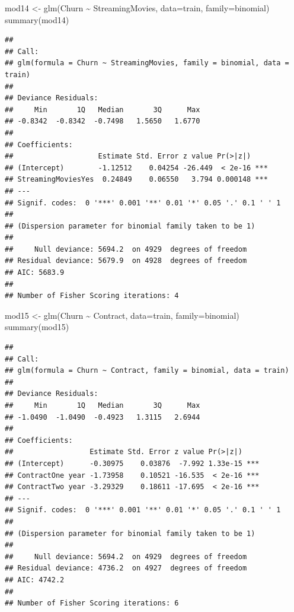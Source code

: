 \documentclass[
  twoside]{article}
\newenvironment{Shaded}{\begin{snugshade}}{\end{snugshade}}
\newcommand{\AttributeTok}[1]{\textcolor[rgb]{0.77,0.63,0.00}{#1}}
\newcommand{\FunctionTok}[1]{\textcolor[rgb]{0.00,0.00,0.00}{#1}}
\newcommand{\NormalTok}[1]{#1}
\newcommand{\OtherTok}[1]{\textcolor[rgb]{0.56,0.35,0.01}{#1}}
\newcommand{\SpecialCharTok}[1]{\textcolor[rgb]{0.00,0.00,0.00}{#1}}
\begin{document}
\begin{Shaded}
\begin{Highlighting}[]
\NormalTok{mod14 }\OtherTok{\textless{}{-}} \FunctionTok{glm}\NormalTok{(Churn }\SpecialCharTok{\textasciitilde{}}\NormalTok{ StreamingMovies, }\AttributeTok{data=}\NormalTok{train, }\AttributeTok{family=}\NormalTok{binomial)}
\FunctionTok{summary}\NormalTok{(mod14)}
\end{Highlighting}
\end{Shaded}

\begin{verbatim}
## 
## Call:
## glm(formula = Churn ~ StreamingMovies, family = binomial, data = train)
## 
## Deviance Residuals: 
##     Min       1Q   Median       3Q      Max  
## -0.8342  -0.8342  -0.7498   1.5650   1.6770  
## 
## Coefficients:
##                    Estimate Std. Error z value Pr(>|z|)    
## (Intercept)        -1.12512    0.04254 -26.449  < 2e-16 ***
## StreamingMoviesYes  0.24849    0.06550   3.794 0.000148 ***
## ---
## Signif. codes:  0 '***' 0.001 '**' 0.01 '*' 0.05 '.' 0.1 ' ' 1
## 
## (Dispersion parameter for binomial family taken to be 1)
## 
##     Null deviance: 5694.2  on 4929  degrees of freedom
## Residual deviance: 5679.9  on 4928  degrees of freedom
## AIC: 5683.9
## 
## Number of Fisher Scoring iterations: 4
\end{verbatim}

\begin{Shaded}
\begin{Highlighting}[]
\NormalTok{mod15 }\OtherTok{\textless{}{-}} \FunctionTok{glm}\NormalTok{(Churn }\SpecialCharTok{\textasciitilde{}}\NormalTok{ Contract, }\AttributeTok{data=}\NormalTok{train, }\AttributeTok{family=}\NormalTok{binomial)}
\FunctionTok{summary}\NormalTok{(mod15)}
\end{Highlighting}
\end{Shaded}

\begin{verbatim}
## 
## Call:
## glm(formula = Churn ~ Contract, family = binomial, data = train)
## 
## Deviance Residuals: 
##     Min       1Q   Median       3Q      Max  
## -1.0490  -1.0490  -0.4923   1.3115   2.6944  
## 
## Coefficients:
##                  Estimate Std. Error z value Pr(>|z|)    
## (Intercept)      -0.30975    0.03876  -7.992 1.33e-15 ***
## ContractOne year -1.73958    0.10521 -16.535  < 2e-16 ***
## ContractTwo year -3.29329    0.18611 -17.695  < 2e-16 ***
## ---
## Signif. codes:  0 '***' 0.001 '**' 0.01 '*' 0.05 '.' 0.1 ' ' 1
## 
## (Dispersion parameter for binomial family taken to be 1)
## 
##     Null deviance: 5694.2  on 4929  degrees of freedom
## Residual deviance: 4736.2  on 4927  degrees of freedom
## AIC: 4742.2
## 
## Number of Fisher Scoring iterations: 6
\end{verbatim}
\end{document}

